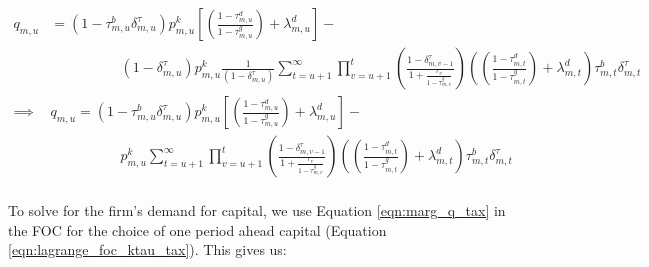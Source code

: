\documentclass[letterpaper,12pt]{article}
\theoremstyle{definition}
\begin{document}
\begin{spacing}{1.5}
\begin{equation}
\label{eqn:marg_q_tax}
\begin{split}
 q_{m,u} & = (1-\tau^{b}_{m,u}\delta^{\tau}_{m,u})p^{k}_{m,u}\left[\left(\frac{1-\tau^{d}_{m,u}}{1-\tau^{g}_{m,u}}\right) + \lambda^{d}_{m,u}\right] - \\
  & \quad\quad\quad\quad\quad(1-\delta^{\tau}_{m,u})p^{k}_{m,u} \frac{1}{(1-\delta^{\tau}_{m,u})} \sum_{t=u+1}^{\infty} \prod_{v=u+1}^{t} \left(\frac{1-\delta^{\tau}_{m,v-1}}{1+\frac{r_{v}}{1-\tau^{g}_{m,v}}} \right)\left(\left(\frac{1-\tau^{d}_{m,t}}{1-\tau^{g}_{m,t}}\right)+\lambda^{d}_{m,t}\right)\tau^{b}_{m,t}\delta^{\tau}_{m,t} \\
\implies & q_{m,u} = (1-\tau^{b}_{m,u}\delta^{\tau}_{m,u})p^{k}_{m,u}\left[\left(\frac{1-\tau^{d}_{m,u}}{1-\tau^{g}_{m,u}}\right) + \lambda^{d}_{m,u}\right] - \\
& \quad\quad\quad\quad\quad p^{k}_{m,u} \sum_{t=u+1}^{\infty} \prod_{v=u+1}^{t} \left(\frac{1-\delta^{\tau}_{m,v-1}}{1+\frac{r_{v}}{1-\tau^{g}_{m,v}}} \right)\left(\left(\frac{1-\tau^{d}_{m,t}}{1-\tau^{g}_{m,t}}\right)+\lambda^{d}_{m,t}\right)\tau^{b}_{m,t}\delta^{\tau}_{m,t} \\
\end{split}
\end{equation}

To solve for the firm's demand for capital, we use Equation \ref{eqn:marg_q_tax} in the FOC for the choice of one period ahead capital (Equation \ref{eqn:lagrange_foc_ktau_tax}).  This gives us:


\end{spacing}
\end{document}
